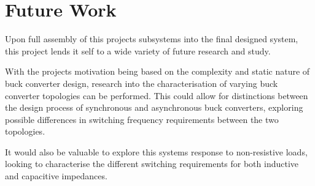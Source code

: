 \section{Future Work}

Upon full assembly of this projects subsystems into the final designed system, this project lends it self to a wide variety of future research and study. 

With the projects motivation being based on the complexity and static nature of buck converter design, research into the characterisation of varying buck converter topologies can be performed. This could allow for distinctions between the design process of synchronous and asynchronous buck converters, exploring possible differences in switching frequency requirements between the two topologies. 

It would also be valuable to explore this systems response to non-resistive loads, looking to characterise the different switching requirements for both inductive and capacitive impedances. 